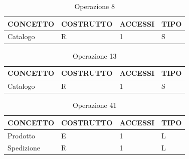 \begin{table}[H]
\centering
\caption{Operazione 8}
\begin{tabular}{llll}
\\ \hline
\multicolumn{1}{|l|}{\textbf{CONCETTO}} & \multicolumn{1}{l|}{\textbf{COSTRUTTO}} & \multicolumn{1}{l|}{\textbf{ACCESSI}} & \multicolumn{1}{l|}{\textbf{TIPO}} \\ \hline
\multicolumn{1}{|l|}{Catalogo}
& \multicolumn{1}{l|}{R}                  & \multicolumn{1}{l|}{1}                & \multicolumn{1}{l|}{S}             \\ \hline
\end{tabular}
\end{table}

\begin{table}[H]
\centering
\caption{Operazione 13}
\begin{tabular}{llll}
\\ \hline
\multicolumn{1}{|l|}{\textbf{CONCETTO}} & \multicolumn{1}{l|}{\textbf{COSTRUTTO}} & \multicolumn{1}{l|}{\textbf{ACCESSI}} & \multicolumn{1}{l|}{\textbf{TIPO}} \\ \hline
\multicolumn{1}{|l|}{Catalogo}
& \multicolumn{1}{l|}{R}                  & \multicolumn{1}{l|}{1}                & \multicolumn{1}{l|}{S}             \\ \hline
\end{tabular}
\end{table}


\begin{table}[H]
\centering
\caption{Operazione 41}
\begin{tabular}{llll}
\\ \hline
\multicolumn{1}{|l|}{\textbf{CONCETTO}} & \multicolumn{1}{l|}{\textbf{COSTRUTTO}} & \multicolumn{1}{l|}{\textbf{ACCESSI}} & \multicolumn{1}{l|}{\textbf{TIPO}} \\ \hline
\multicolumn{1}{|l|}{Prodotto}             & \multicolumn{1}{l|}{E}                  & \multicolumn{1}{l|}{1}
& \multicolumn{1}{l|}{L}
			 \\ \hline
\multicolumn{1}{|l|}{Spedizione}
& \multicolumn{1}{l|}{R}                  & \multicolumn{1}{l|}{1}                & \multicolumn{1}{l|}{L}             \\ \hline
\end{tabular}
\end{table}


